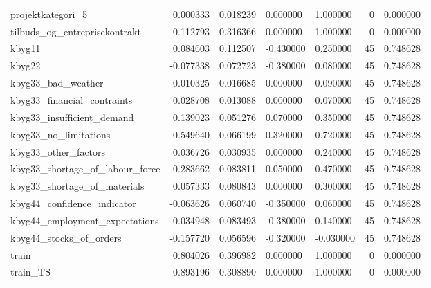 \begin{landscape}
\begin{longtable}[h!]{lrrllrr}
projektkategori_5 & 0.000333 & 0.018239 & 0.000000 & 1.000000 & 0 & 0.000000 \\
tilbuds_og_entreprisekontrakt & 0.112793 & 0.316366 & 0.000000 & 1.000000 & 0 & 0.000000 \\
kbyg11 & 0.084603 & 0.112507 & -0.430000 & 0.250000 & 45 & 0.748628 \\
kbyg22 & -0.077338 & 0.072723 & -0.380000 & 0.080000 & 45 & 0.748628 \\
kbyg33_bad_weather & 0.010325 & 0.016685 & 0.000000 & 0.090000 & 45 & 0.748628 \\
kbyg33_financial_contraints & 0.028708 & 0.013088 & 0.000000 & 0.070000 & 45 & 0.748628 \\
kbyg33_insufficient_demand & 0.139023 & 0.051276 & 0.070000 & 0.350000 & 45 & 0.748628 \\
kbyg33_no_limitations & 0.549640 & 0.066199 & 0.320000 & 0.720000 & 45 & 0.748628 \\
kbyg33_other_factors & 0.036726 & 0.030935 & 0.000000 & 0.240000 & 45 & 0.748628 \\
kbyg33_shortage_of_labour_force & 0.283662 & 0.083811 & 0.050000 & 0.470000 & 45 & 0.748628 \\
kbyg33_shortage_of_materials & 0.057333 & 0.080843 & 0.000000 & 0.300000 & 45 & 0.748628 \\
kbyg44_confidence_indicator & -0.063626 & 0.060740 & -0.350000 & 0.060000 & 45 & 0.748628 \\
kbyg44_employment_expectations & 0.034948 & 0.083493 & -0.380000 & 0.140000 & 45 & 0.748628 \\
kbyg44_stocks_of_orders & -0.157720 & 0.056596 & -0.320000 & -0.030000 & 45 & 0.748628 \\
train & 0.804026 & 0.396982 & 0.000000 & 1.000000 & 0 & 0.000000 \\
train_TS & 0.893196 & 0.308890 & 0.000000 & 1.000000 & 0 & 0.000000 \\
\end{longtable}\end{landscape}
